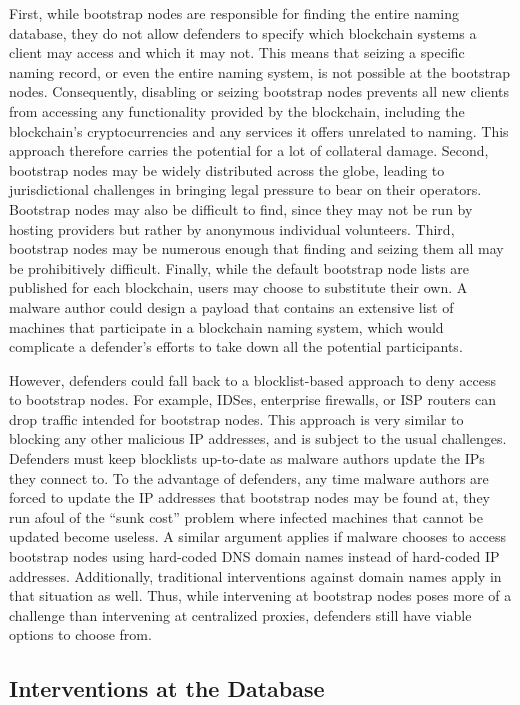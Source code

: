 First, while bootstrap nodes are responsible for finding the 
entire naming database, they do not allow defenders to 
specify which blockchain systems a client may access and 
which it may not. This means that seizing a specific naming 
record, or even the entire naming system, is not possible at 
the bootstrap nodes. Consequently, disabling or seizing 
bootstrap nodes prevents all new clients from accessing any 
functionality provided by the blockchain, including the 
blockchain's cryptocurrencies and any services it offers 
unrelated to naming. This approach therefore carries the 
potential for a lot of collateral damage. Second, bootstrap 
nodes may be widely distributed across the globe, leading to 
jurisdictional challenges in bringing legal pressure to bear 
on their operators. Bootstrap nodes may also be difficult to 
find, since they may not be run by hosting providers but 
rather by anonymous individual volunteers. Third, bootstrap 
nodes may be numerous enough that finding and seizing them 
all may be prohibitively difficult. Finally, while the 
default bootstrap node lists are published for each 
blockchain, users may choose to substitute their own. A 
malware author could design a payload that contains an 
extensive list of machines that participate in a blockchain 
naming system, which would complicate a defender's efforts to 
take down all the potential participants. 

However, defenders could fall back to a blocklist-based 
approach to deny access to bootstrap nodes. For example, 
IDSes, enterprise firewalls, or ISP routers can drop traffic 
intended for bootstrap nodes. This approach is very similar 
to blocking any other 
malicious IP addresses, and is subject to the usual 
challenges. Defenders must keep blocklists up-to-date as 
malware authors update the IPs they connect to. To the 
advantage of defenders, any time malware authors 
are forced to update the IP addresses that bootstrap nodes 
may be found at, they run afoul of the ``sunk cost'' problem 
where infected machines that cannot be updated become
useless. A similar argument applies if malware chooses to 
access bootstrap nodes using hard-coded DNS domain names 
instead of hard-coded IP addresses. Additionally, 
traditional interventions against domain names apply in that 
situation as well. Thus, while intervening at bootstrap nodes 
poses more of a challenge than intervening at centralized 
proxies, defenders still have viable options to choose from.

\subsection{Interventions at the Database}

